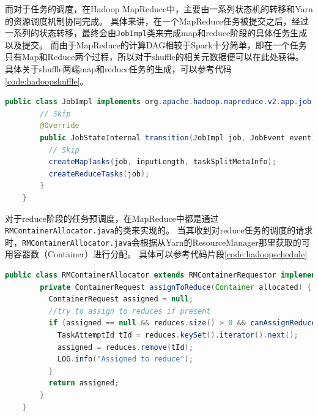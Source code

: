 而对于任务的调度，在Hadoop MapReduce中，主要由一系列状态机的转移和Yarn\cite{yarn}的资源调度机制协同完成。
具体来讲，在一个MapReduce任务被提交之后，经过一系列的状态转移，最终会由\verb|JobImpl|类来完成map和reduce阶段的具体任务生成以及提交。
而由于MapReduce的计算DAG相较于Spark十分简单，即在一个任务只有Map和Reduce两个过程，所以对于shuffle的相关元数据便可以在此处获得。
具体关于shuffle两端map和reduce任务的生成，可以参考代码\ref{code:hadoopshuffle}。

\begin{lstlisting}[language={Java}, caption={Hadoop MapReduce中shuffle元数据生成代码片段}, label={code:hadoopshuffle}]
    public class JobImpl implements org.apache.hadoop.mapreduce.v2.app.job.Job, EventHandler<JobEvent> {
        // Skip
        @Override
        public JobStateInternal transition(JobImpl job, JobEvent event) {
          // Skip
          createMapTasks(job, inputLength, taskSplitMetaInfo);
          createReduceTasks(job);
        }
    }
\end{lstlisting}

对于reduce阶段的任务预调度，在MapReduce中都是通过\verb|RMContainerAllocator.java|的类来实现的。
当其收到对reduce任务的调度的请求时，\verb|RMContainerAllocator.java|会根据从Yarn的ResourceManager那里获取的可用容器数（Container）进行分配。
具体可以参考代码片段\ref{code:hadoopschedule}

\begin{lstlisting}[language={Java}, caption={Hadoop MapReduce中reduce任务调度代码片段}, label={code:hadoopschedule}]
    public class RMContainerAllocator extends RMContainerRequestor implements ContainerAllocator {
        private ContainerRequest assignToReduce(Container allocated) {
          ContainerRequest assigned = null;
          //try to assign to reduces if present
          if (assigned == null && reduces.size() > 0 && canAssignReduces()) {
            TaskAttemptId tId = reduces.keySet().iterator().next();
            assigned = reduces.remove(tId);
            LOG.info("Assigned to reduce");
          }
          return assigned;
        }
    }
\end{lstlisting}

